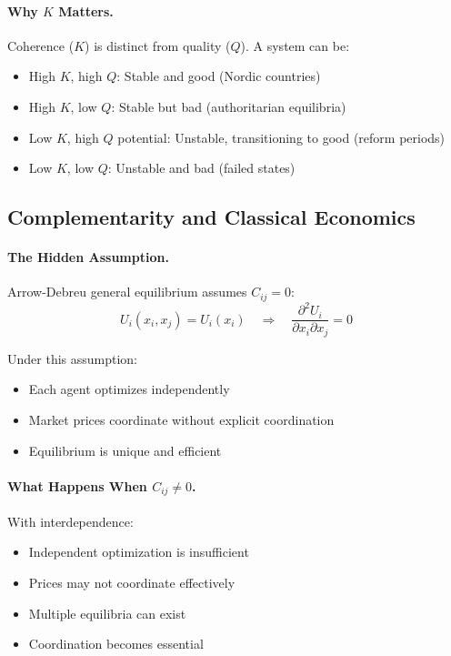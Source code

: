 \documentclass[12pt,a4paper]{article}
\begin{document}
\paragraph{Why $K$ Matters.}
Coherence ($K$) is distinct from quality ($Q$).
A system can be:
\begin{itemize}
  \item High $K$, high $Q$: Stable and good (Nordic countries)
  \item High $K$, low $Q$: Stable but bad (authoritarian equilibria)
  \item Low $K$, high $Q$ potential: Unstable, transitioning to good (reform periods)
  \item Low $K$, low $Q$: Unstable and bad (failed states)
\end{itemize}

\subsection{Complementarity and Classical Economics}

\paragraph{The Hidden Assumption.}
Arrow-Debreu general equilibrium \citep{arrowdeb} assumes $C_{ij} = 0$:
\begin{equation}
  U_i(x_i, x_j) = U_i(x_i) \quad \Rightarrow \quad \frac{\partial^2 U_i}{\partial x_i \partial x_j} = 0
\end{equation}

Under this assumption:
\begin{itemize}
  \item Each agent optimizes independently
  \item Market prices coordinate without explicit coordination
  \item Equilibrium is unique and efficient
\end{itemize}

\paragraph{What Happens When $C_{ij} \neq 0$.}
With interdependence:
\begin{itemize}
  \item Independent optimization is insufficient
  \item Prices may not coordinate effectively
  \item Multiple equilibria can exist
  \item Coordination becomes essential
\end{itemize}
\end{document}
